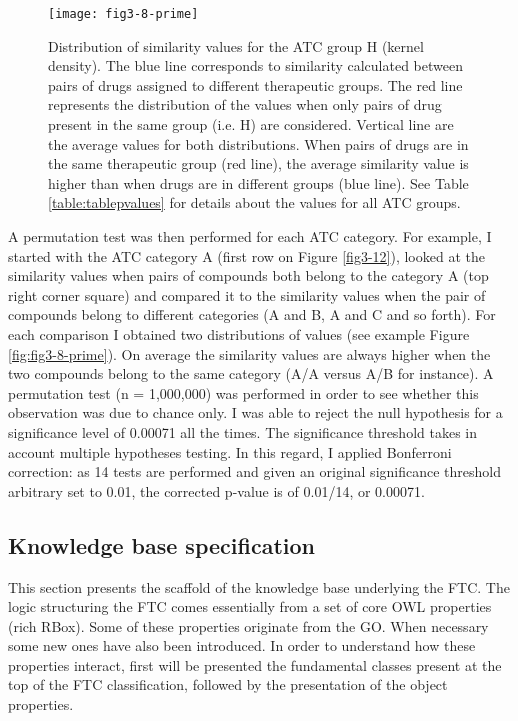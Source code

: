 \begin{figure}[ht]
    \centering
    \texttt{[image: fig3-8-prime]}
    \caption{Distribution of similarity values for the ATC group H (kernel density). The blue line corresponds to similarity calculated between pairs of drugs assigned to different therapeutic groups. The red line represents the distribution of the values when only pairs of drug present in the same group (i.e. H) are considered. Vertical line are the average values for both distributions. When pairs of drugs are in the same therapeutic group (red line), the average similarity value is higher than when drugs are in different groups (blue line). See Table \ref{table:tablepvalues} for details about the values for all ATC groups.}
    \label{fig3-8-prime}
\end{figure}

A permutation test was then performed for each ATC category. For example, I started with the ATC category A (first row on Figure \ref{fig3-12}), looked at the similarity values when pairs of compounds both belong to the category A (top right corner square) and compared it to the similarity values when the pair of compounds belong to different categories (A and B, A and C and so forth). For each comparison I obtained two distributions of values (see example Figure \ref{fig:fig3-8-prime}). On average the similarity values are always higher when the two compounds belong to the same category (A/A versus A/B for instance). A permutation test (n = 1,000,000) was performed in order to see whether this observation was due to chance only. I was able to reject the null hypothesis for a significance level of 0.00071 all the times.
The significance threshold takes in account multiple hypotheses testing. In this regard, I applied Bonferroni correction: as 14 tests are performed and given an original significance threshold arbitrary set to 0.01, the corrected p-value is of 0.01/14, or 0.00071.

\subsection{Knowledge base specification}
\label{specskb}

This section presents the scaffold of the knowledge base underlying the FTC. The logic structuring the FTC comes essentially from a set of core OWL properties (rich RBox). Some of these properties originate from the GO. When necessary some new ones have also been introduced. In order to understand how these properties interact, first will be presented the fundamental classes present at the top of the FTC classification, followed by the presentation of the object properties.

